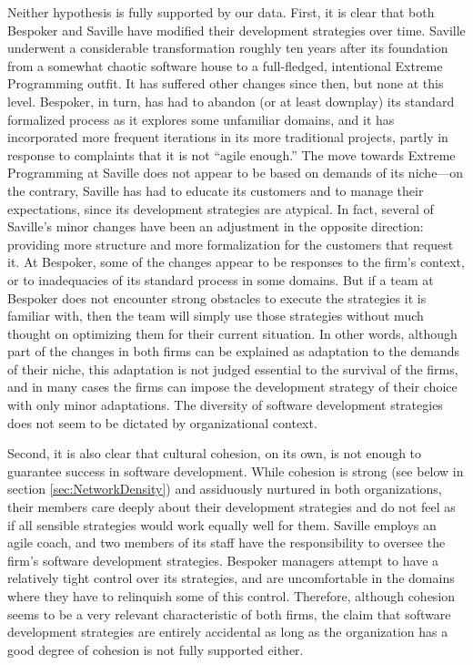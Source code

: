 Neither hypothesis is fully supported by our data. First, it is clear that both Bespoker and Saville have modified their development strategies over time. Saville underwent a considerable transformation roughly ten years after its foundation from a somewhat chaotic software house to a full-fledged, intentional Extreme Programming outfit. It has suffered other changes since then, but none at this level. Bespoker, in turn, has had to abandon (or at least downplay) its standard formalized process as it explores some unfamiliar domains, and it has incorporated more frequent iterations in its more traditional projects, partly in response to complaints that it is not ``agile enough.'' The move towards Extreme Programming at Saville does not appear to be based on demands of its niche---on the contrary, Saville has had to educate its customers and to manage their expectations, since its development strategies are atypical. In fact, several of Saville's minor changes have been an adjustment in the opposite direction: providing more structure and more formalization for the customers that request it. At Bespoker, some of the changes appear to be responses to the firm's context, or to inadequacies of its standard process in some domains. But if a team at Bespoker does not encounter strong obstacles to execute the strategies it is familiar with, then the team will simply use those strategies without much thought on optimizing them for their current situation. In other words, although part of the changes in both firms can be explained as adaptation to the demands of their niche, this adaptation is not judged essential to the survival of the firms, and in many cases the firms can impose the development strategy of their choice with only minor adaptations. The diversity of software development strategies does not seem to be dictated by organizational context.

Second, it is also clear that cultural cohesion, on its own, is not enough to guarantee success in software development. While cohesion is strong (see below in section \ref{sec:NetworkDensity}) and assiduously nurtured in both organizations, their members care deeply about their development strategies and do not feel as if all sensible strategies would work equally well for them. Saville employs an agile coach, and two members of its staff have the responsibility to oversee the firm's software development strategies. Bespoker managers attempt to have a relatively tight control over its strategies, and are uncomfortable in the domains where they have to relinquish some of this control. Therefore, although cohesion seems to be a very relevant characteristic of both firms, the claim that software development strategies are entirely accidental as long as the organization has a good degree of cohesion is not fully supported either.

